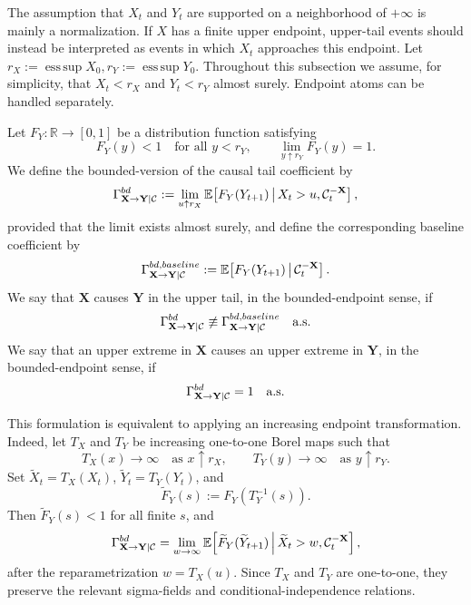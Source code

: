 \documentclass[a4paper,11pt]{article}
\begin{document}
The assumption that \(X_t\) and \(Y_t\) are supported on a neighborhood of
\(+\infty\) is mainly a normalization. If \(X\) has a finite upper endpoint,
upper-tail events should instead be interpreted as events in which \(X_t\)
approaches this endpoint. Let
\(
    r_X:=\operatorname{ess\,sup} X_0,
    r_Y:=\operatorname{ess\,sup} Y_0 .
\)
Throughout this subsection we assume, for simplicity, that
\(X_t<r_X\) and \(Y_t<r_Y\) almost surely. Endpoint atoms can be handled
separately. 

Let \(F_Y:\mathbb R\to[0,1]\) be a distribution function satisfying
\[
    F_Y(y)<1 \quad\text{for all } y<r_Y,
    \qquad
    \lim_{y\uparrow r_Y}F_Y(y)=1.
\]
We define the bounded-version of the causal tail coefficient by
\[
\Gamma^{\rm bd}_{\mathbf X\to\mathbf Y\mid\mathcal C}
:=
\lim_{u\uparrow r_X}
\mathbb E\!\left[
    F_Y(Y_{t+1})
    \,\middle|\,
    X_t>u,\mathcal C_t^{-\mathbf X}
\right],
\]
provided that the limit exists almost surely, and define the corresponding baseline
coefficient by
\[
\Gamma^{{\rm bd},baseline}_{\mathbf X\to\mathbf Y\mid\mathcal C}
:=
\mathbb E\!\left[
    F_Y(Y_{t+1})
    \,\middle|\,
    \mathcal C_t^{-\mathbf X}
\right].
\]
We say that \(\mathbf X\) causes \(\mathbf Y\) in the upper tail, in the
bounded-endpoint sense, if
\[
    \Gamma^{\rm bd}_{\mathbf X\to\mathbf Y\mid\mathcal C}
    \not\equiv
    \Gamma^{{\rm bd},baseline}_{\mathbf X\to\mathbf Y\mid\mathcal C}
    \quad\text{a.s.}
\]
We say that an upper extreme in \(\mathbf X\) causes an upper extreme in
\(\mathbf Y\), in the bounded-endpoint sense, if
\[
    \Gamma^{\rm bd}_{\mathbf X\to\mathbf Y\mid\mathcal C}=1
    \quad\text{a.s.}
\]

This formulation is equivalent to applying an increasing endpoint transformation.
Indeed, let \(T_X\) and \(T_Y\) be increasing one-to-one Borel maps such that
\[
    T_X(x)\to\infty \quad\text{as } x\uparrow r_X,
    \qquad
    T_Y(y)\to\infty \quad\text{as } y\uparrow r_Y.
\]
Set \(\widetilde X_t=T_X(X_t)\), \(\widetilde Y_t=T_Y(Y_t)\), and
\[
    \widetilde F_Y(s):=F_Y(T_Y^{-1}(s)).
\]
Then \(\widetilde F_Y(s)<1\) for all finite \(s\), and
\[
\Gamma^{\rm bd}_{\mathbf X\to\mathbf Y\mid\mathcal C}
=
\lim_{w\to\infty}
\mathbb E\!\left[
    \widetilde F_Y(\widetilde Y_{t+1})
    \,\middle|\,
    \widetilde X_t>w,\mathcal C_t^{-\mathbf X}
\right],
\]
after the reparametrization \(w=T_X(u)\). Since \(T_X\) and \(T_Y\) are
one-to-one, they preserve the relevant sigma-fields and conditional-independence
relations.
\end{document}
